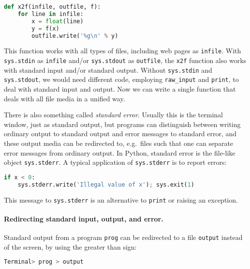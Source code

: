 \documentclass[graybox,sectrefs,envcountresetchap,open=right,final]{svmonodo}
\begin{document}
\begin{lstlisting}[language=python,style=simple,xleftmargin=2mm]
def x2f(infile, outfile, f):
    for line in infile:
        x = float(line)
        y = f(x)
        outfile.write('%g\n' % y)

\end{lstlisting}

This function works with all types of files, including
web pages as \texttt{infile}.
With \texttt{sys.stdin} as \texttt{infile} and/or \texttt{sys.stdout}
as \texttt{outfile}, the \texttt{x2f} function also works with standard input
and/or standard output. Without \texttt{sys.stdin} and \texttt{sys.stdout},
we would need different code, employing \Verb!raw_input!
and \texttt{print},
to deal with standard input and output. Now we can write a single
function that deals with all file media in a unified way.


There is also something called \emph{standard error}.
Usually this is the terminal window, just as standard output, but
programs can distinguish between writing ordinary output to standard
output and error messages to standard error, and these output media
can be redirected to, e.g.~files such that one can separate
error messages from ordinary output.
In Python, standard error is the file-like object \texttt{sys.stderr}.
A typical application of \texttt{sys.stderr} is to report errors:




\begin{lstlisting}[language=python,style=simple,xleftmargin=2mm]
if x < 0:
    sys.stderr.write('Illegal value of x'); sys.exit(1)

\end{lstlisting}

This message to \texttt{sys.stderr} is an alternative to
\texttt{print} or raising an exception.

\paragraph{Redirecting standard input, output, and error.}
Standard output from a program \texttt{prog}
can be redirected to a file
\texttt{output} instead of the screen, by
using the greater than sign:



\begin{lstlisting}[language=bash,style=simple,xleftmargin=2mm]
Terminal> prog > output

\end{lstlisting}
\end{document}
